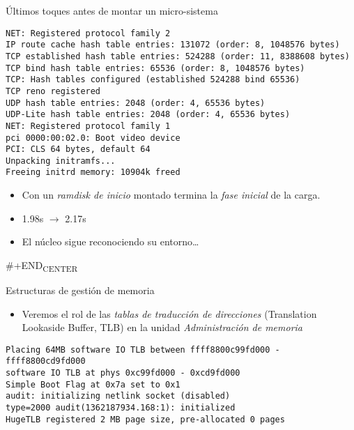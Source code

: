 \documentclass[presentation]{beamer}
\begin{document}
\begin{frame}[label={sec:orgf33c331},fragile]{Últimos toques antes de montar un micro-sistema}
 \begin{verbatim}
NET: Registered protocol family 2
IP route cache hash table entries: 131072 (order: 8, 1048576 bytes)
TCP established hash table entries: 524288 (order: 11, 8388608 bytes)
TCP bind hash table entries: 65536 (order: 8, 1048576 bytes)
TCP: Hash tables configured (established 524288 bind 65536)
TCP reno registered
UDP hash table entries: 2048 (order: 4, 65536 bytes)
UDP-Lite hash table entries: 2048 (order: 4, 65536 bytes)
NET: Registered protocol family 1
pci 0000:00:02.0: Boot video device
PCI: CLS 64 bytes, default 64
Unpacking initramfs...
Freeing initrd memory: 10904k freed
\end{verbatim}
\begin{itemize}
\item Con un \emph{ramdisk de inicio} montado termina la \emph{fase inicial} de la carga.
\item 1.98s \(\rightarrow\) 2.17s
\item El núcleo sigue reconociendo su entorno\ldots{}
\end{itemize}
\#+END\textsubscript{CENTER}
\end{frame}

\begin{frame}[label={sec:orgc9d6ad9},fragile]{Estructuras de gestión de memoria}
 \begin{itemize}
\item Veremos el rol de las \emph{tablas de traducción de direcciones}
(Translation Lookaside Buffer, TLB) en la unidad \emph{Administración de
memoria}
\end{itemize}
\begin{verbatim}
Placing 64MB software IO TLB between ffff8800c99fd000 - ffff8800cd9fd000
software IO TLB at phys 0xc99fd000 - 0xcd9fd000
Simple Boot Flag at 0x7a set to 0x1
audit: initializing netlink socket (disabled)
type=2000 audit(1362187934.168:1): initialized
HugeTLB registered 2 MB page size, pre-allocated 0 pages
\end{verbatim}
\end{frame}
\end{document}
